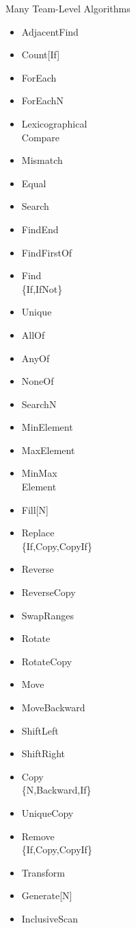 \begin{frame}[fragile]{Many Team-Level Algorithms}
\begin{multicols}{4}
\begin{itemize}
    \itemsep0em 
    \item AdjacentFind
    \item Count[If]
    \item ForEach
    \item ForEachN
    \item {Lexicographical\\Compare}
    \item Mismatch
    \item Equal
    \item Search
    \item FindEnd
    \item FindFirstOf
    \item Find\\\{If,IfNot\}
    \item Unique
\end{itemize}
\columnbreak
\begin{itemize}

    \itemsep0em
    \item AllOf
    \item AnyOf
    \item NoneOf
    \item SearchN
    \item MinElement
    \item MaxElement
    \item {MinMax\\Element}
    \item Fill[N]
    \item Replace\\\{If,Copy,CopyIf\}
    \item Reverse
    \item ReverseCopy
    \item SwapRanges
\end{itemize}
\columnbreak
\begin{itemize}

    \itemsep0em
    \item Rotate
    \item RotateCopy
    \item Move
    \item MoveBackward
    \item ShiftLeft
    \item ShiftRight
    \item Copy\\\{N,Backward,If\}
    \item UniqueCopy
    \item {Remove\\\{If,Copy,CopyIf\}}
    \item Transform
    \item Generate[N]
    \item InclusiveScan


\end{itemize}
\end{multicols}
\end{frame}
